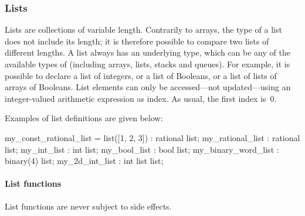\subsubsection{Lists}

Lists are collections of variable length.
Contrarily to arrays, the type of a list does not include its length; it is therefore possible to compare two lists of different lengths.
A list always has an underlying type, which can be any of the available types of \imitator{} (including arrays, lists, stacks and queues).
For example, it is possible to declare a list of integers, or a list of Booleans, or a list of lists of arrays of Booleans.
%
List elements can only be accessed---not updated---using an integer-valued arithmetic expression as index.
As usual, the first index is~0.


Examples of list definitions are given below:

\begin{IMITATORmodel}
	my_const_rational_list = list([1, 2, 3]) : rational list;
	my_rational_list 			: rational list;
	my_int_list						: int list;
	my_bool_list        	: bool list;
	my_binary_word_list 	: binary(4) list;
	my_2d_int_list      	: int list list;
\end{IMITATORmodel}


\paragraph{List functions}

List functions are never subject to side effects.

